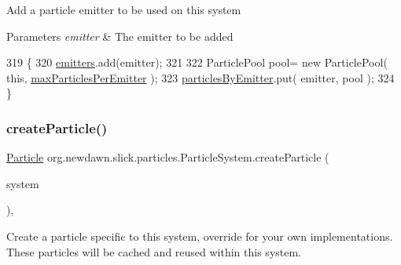 Add a particle emitter to be used on this system


\begin{DoxyParams}{Parameters}
{\em emitter} & The emitter to be added \\
\hline
\end{DoxyParams}

\begin{DoxyCode}
319                                                     \{
320         \mbox{\hyperlink{classorg_1_1newdawn_1_1slick_1_1particles_1_1_particle_system_aee956700fc1881201435275fdd6fc32b}{emitters}}.add(emitter);
321         
322         ParticlePool pool= \textcolor{keyword}{new} ParticlePool( \textcolor{keyword}{this}, \mbox{\hyperlink{classorg_1_1newdawn_1_1slick_1_1particles_1_1_particle_system_a388bac741ed59a82c0f7bbf0fc308673}{maxParticlesPerEmitter}} );
323         \mbox{\hyperlink{classorg_1_1newdawn_1_1slick_1_1particles_1_1_particle_system_aec10bb63c0065ee17c8d8133936f5db6}{particlesByEmitter}}.put( emitter, pool );
324     \}
\end{DoxyCode}
\mbox{\label{classorg_1_1newdawn_1_1slick_1_1particles_1_1_particle_system_ac03492cca10c01f7df6968e4293f65b7}} 
\subsubsection{\texorpdfstring{create\+Particle()}{createParticle()}}
{\footnotesize\ttfamily \mbox{\hyperlink{classorg_1_1newdawn_1_1slick_1_1particles_1_1_particle}{Particle}} org.\+newdawn.\+slick.\+particles.\+Particle\+System.\+create\+Particle (\begin{DoxyParamCaption}\item[{\mbox{\hyperlink{classorg_1_1newdawn_1_1slick_1_1particles_1_1_particle_system}{Particle\+System}}}]{system }\end{DoxyParamCaption})\hspace{0.3cm}{\ttfamily [inline]}, {\ttfamily [protected]}}

Create a particle specific to this system, override for your own implementations. These particles will be cached and reused within this system.



